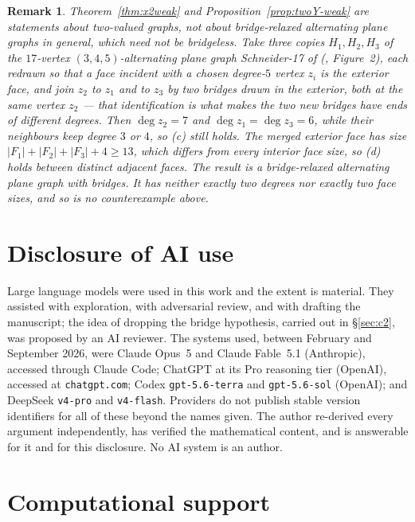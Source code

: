 \documentclass{baustms}
\theoremstyle{cupthm}
\theoremstyle{cupdefn}
\theoremstyle{cuprem}
\newtheorem{remark}[theorem]{Remark}
\begin{document}
\begin{remark}\label{rem:bridged}
Theorem~\ref{thm:x2weak} and Proposition~\ref{prop:twoY-weak} are statements
about two-valued graphs, not about bridge-relaxed alternating plane graphs in
general, which need not be bridgeless. Take three copies $H_1,H_2,H_3$ of the
$17$-vertex $(3,4,5)$-alternating plane graph Schneider-17 of
(\cite{AHSSV2015}, Figure~2), each redrawn so that a face incident with a chosen
degree-$5$ vertex $z_i$ is the exterior face, and join $z_2$ to $z_1$ and to
$z_3$ by two bridges drawn in the exterior, both at the \emph{same} vertex $z_2$ ---
that identification is what makes the two new bridges have ends of different
degrees. Then $\deg z_2 = 7$ and
$\deg z_1 = \deg z_3 = 6$, while their neighbours keep degree $3$ or $4$, so
(c) still holds. The merged exterior face has size
$|F_1|+|F_2|+|F_3|+4 \ge 13$, which differs from every interior face size, so (d)
holds between distinct adjacent faces. The result is a bridge-relaxed
alternating plane graph with bridges. It has neither exactly two degrees nor
exactly two face sizes, and so is no counterexample above.
\end{remark}

\section*{Disclosure of AI use}

Large language models were used in this work and the extent is material. They
assisted with exploration, with adversarial review, and with drafting the
manuscript; the idea of dropping the bridge hypothesis, carried out in
\S\ref{sec:c2}, was proposed by an AI reviewer. The systems used, between
February and September 2026, were Claude Opus~5 and Claude Fable~5.1
(Anthropic), accessed through Claude Code; ChatGPT at its Pro reasoning tier
(OpenAI), accessed at \texttt{chatgpt.com}; Codex \texttt{gpt-5.6-terra} and
\texttt{gpt-5.6-sol} (OpenAI); and DeepSeek \texttt{v4-pro} and
\texttt{v4-flash}. Providers do not publish stable version identifiers for all
of these beyond the names given. The author re-derived every argument
independently, has verified the mathematical content, and is answerable for it
and for this disclosure. No AI system is an author.

\section*{Computational support}
\end{document}
